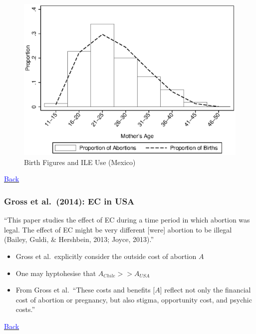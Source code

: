 \documentclass[10pt,letterpaper,subeqn]{beamer}
\begin{document}
\begin{frame}[label=empirA1]
\begin{figure}
\begin{center}
\caption{Birth Figures and ILE Use (Mexico)}
\includegraphics[scale=0.7]{./figures/birthDescriptives.eps}
\end{center}
\end{figure}
\hyperlink{empirB}{\textcolor{blue}{Back}}
\end{frame}


\begin{frame}[label=GrossEtAl]
\frametitle{Gross et al.\ (2014): EC in USA}
``This paper studies the effect of EC during a time period in which abortion was legal. 
The effect of EC might be very different [were] abortion to be illegal 
(Bailey, Guldi, \& Hershbein, 2013; Joyce, 2013).''
\vspace{6mm}
\begin{itemize}
\item Gross et al.\ explicitly consider the outside cost of abortion $A$
\item One may hyptohesise that $A_{Chile}>>A_{USA}$
\item From Gross et al.\ ``These costs and benefits [$A$] reflect not only the financial 
cost of abortion or pregnancy, but also stigma, opportunity cost, and psychic costs.''
\vspace{7mm}
\end{itemize}
\hyperlink{empirA3}{\textcolor{blue}{Back}}
\end{frame}
\end{document}
